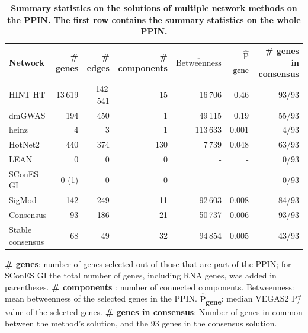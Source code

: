 \documentclass[10pt,letterpaper]{article}
\newlength\savedwidth
\newcommand\thickhline{\noalign{\global\savedwidth\arrayrulewidth\global\arrayrulewidth 2pt}%
\hline
\noalign{\global\arrayrulewidth\savedwidth}}
\newcommand{\mean}[1]{$\overline{\mbox{#1}}$}
\newcommand{\median}[1]{$\hat{\mbox{#1}}$}
\begin{document}
\begin{table}[!ht]
  \begin{adjustwidth}{-2.25in}{0in} %
  \centering
  \caption{
  {\bf Summary statistics on the solutions of multiple network methods on the PPIN. The first row contains the summary statistics on the whole PPIN.}}
  \begin{tabular}{lrrrrrr}
  {\bf Network } & {\bf \# genes } & {\bf \# edges } & {\bf \# components } & {\bf \mean{Betweenness} } & {\bf \median{P}\textsubscript{gene} } & {\bf \# genes in consensus } \\
  \thickhline
  HINT HT           & 13\,619 & 142\,541  & 15  & 16\,706   & 0.46  & 93/93 \\
  \hline
  dmGWAS            & 194     & 450       & 1   & 49\,115   & 0.19  & 55/93 \\
  heinz             & 4       & 3         & 1   & 113\,633  & 0.001 & 4/93  \\
  HotNet2           & 440     & 374       & 130 & 7\,739    & 0.048 & 63/93 \\
  LEAN              & 0       & 0         & 0   & -         & -     & 0/93  \\
  SConES GI         & 0 (1)   & 0         & 0   & -         & -     & 0/93  \\
  SigMod            & 142     & 249       & 11  & 92\,603   & 0.008 & 84/93 \\
  \hline
  Consensus         & 93      & 186       & 21  & 50\,737   & 0.006 & 93/93 \\
  Stable consensus  & 68      & 49        & 32  & 94\,854   & 0.005 & 43/93 \\
  \end{tabular}
  \begin{flushleft} \textbf{\# genes}: number of genes selected out of those that are part of the PPIN; for SConES GI the total number of genes, including RNA genes, was added in parentheses. {\bf \# components }: number of connected components. \textbf{\mean{Betweenness}}: mean betweenness of the selected genes in the PPIN. \textbf{\median{P}\textsubscript{gene}}: median VEGAS2 P\=/value of the selected genes. \textbf{\# genes in consensus}: Number of genes in common between the method's solution, and the 93 genes in the consensus solution.
  \end{flushleft}
  \label{tab:gene_solutions}
  \end{adjustwidth}
\end{table}
\end{document}
